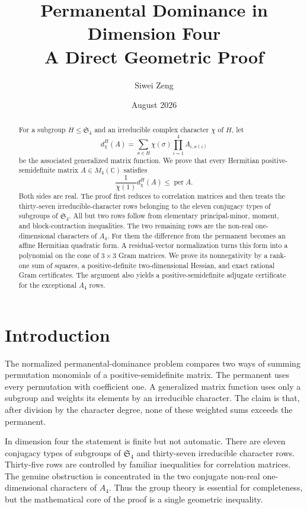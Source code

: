 \documentclass[11pt]{article}
\title{Permanental Dominance in Dimension Four\\
  \large A Direct Geometric Proof}
\author{Siwei Zeng}
\date{August 2026}
\theoremstyle{definition}
\newcommand{\CC}{\mathbb C}
\newcommand{\Sn}{\mathfrak S}
\newcommand{\per}{\operatorname{per}}
\begin{document}
\maketitle

\begin{abstract}
For a subgroup $H\leq \Sn_4$ and an irreducible complex character $\chi$ of
$H$, let
\[
  d_\chi^H(A)=\sum_{\sigma\in H}\chi(\sigma)
  \prod_{i=1}^4 A_{i,\sigma(i)}
\]
be the associated generalized matrix function.  We prove that every
Hermitian positive-semidefinite matrix $A\in M_4(\CC)$ satisfies
\[
  \frac{1}{\chi(1)}d_\chi^H(A)\leq \per A.
\]
Both sides are real.  The proof first reduces to correlation matrices and
then treats the thirty-seven irreducible-character rows belonging to the
eleven conjugacy types of subgroups of $\Sn_4$.  All but two rows follow from
elementary principal-minor, moment, and block-contraction inequalities.  The
two remaining rows are the non-real one-dimensional characters of $A_4$.
For them the difference from the permanent becomes an affine Hermitian
quadratic form.  A residual-vector normalization turns this form into a
polynomial on the cone of $3\times3$ Gram matrices.  We prove its
nonnegativity by a rank-one sum of squares, a positive-definite
two-dimensional Hessian, and exact rational Gram certificates.  The argument
also yields a positive-semidefinite adjugate certificate for the exceptional
$A_4$ rows.
\end{abstract}

\setcounter{tocdepth}{1}
\tableofcontents

\section{Introduction}

The normalized permanental-dominance problem compares two ways of summing
permutation monomials of a positive-semidefinite matrix.  The permanent uses
every permutation with coefficient one.  A generalized matrix function uses
only a subgroup and weights its elements by an irreducible character.  The
claim is that, after division by the character degree, none of these weighted
sums exceeds the permanent.

In dimension four the statement is finite but not automatic.  There are
eleven conjugacy types of subgroups of $\Sn_4$ and thirty-seven irreducible
character rows.  Thirty-five rows are controlled by familiar inequalities
for correlation matrices.  The genuine obstruction is concentrated in the
two conjugate non-real one-dimensional characters of $A_4$.  Thus the group
theory is essential for completeness, but the mathematical core of the proof
is a single geometric inequality.
\end{document}
